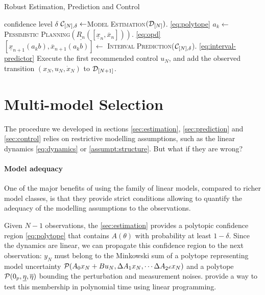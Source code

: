 \documentclass{article}
\begin{document}
\begin{algorithm}[tb]
	\caption{Robust Estimation, Prediction and Control}
	\label{alg:full}
	\begin{algorithmic}
		 confidence level $\delta$
		\STATE $\mathcal{C}_{[N],\delta} \gets$\textsc{Model Estimation}$(\mathcal{D}_{[N]})$. \eqref{eq:polytope}
		\STATE $a_k\gets$\textsc{Pessimistic Planning}$(\underline{R_n}([\underline{x}_{n}, \overline{x}_{n}]))$.  \eqref{eq:opd}
		\STATE $[\underline{x}_{n+1}(a_k b), \overline{x}_{n+1}(a_k b)]\gets$ \textsc{Interval Prediction}($\mathcal{C}_{[N],\delta}$). \eqref{eq:interval-predictor}
		\ENDFOR
		\ENDFOR
		\STATE Execute the first recommended control $u_N$, and add the observed transition $(x_N, u_N, \dot{x}_N)$ to $\mathcal{D}_{[N+1]}$.
		\ENDFOR
	\end{algorithmic}
\end{algorithm}

\section{Multi-model Selection}
\label{sec:multi-model}

The procedure we developed in sections \ref{sec:estimation}, \ref{sec:prediction} and \ref{sec:control} relies on restrictive modelling assumptions, such as the linear dynamics \eqref{eq:dynamics} or \autoref{assumpt:structure}. But what if they are wrong?

\paragraph{Model adequacy}

One of the major benefits of using the family of linear models, compared to richer model classes, is that they provide strict conditions allowing to quantify the adequacy of the modelling assumptions to the observations.

Given $N-1$ observations, the \autoref{sec:estimation} provides a polytopic confidence region \eqref{eq:polytope} that contains $A(\theta)$ with probability at least $1-\delta$. Since the dynamics are linear, we can propagate this confidence region to the next observation: $y_{N}$ must belong to the Minkowski sum of a polytope representing model uncertainty $\mathcal{P}(A_{0} x_N + Bu_N, \Delta A_{1}x_N,\cdots \Delta A_{2^d}x_N)$ and a polytope $\mathcal{P}(0_p, \underline{\eta}, \overline{\eta})$ bounding the perturbation and measurement noises. \citet{delos2015} provide a way to test this membership in polynomial time using linear programming.
\end{document}
